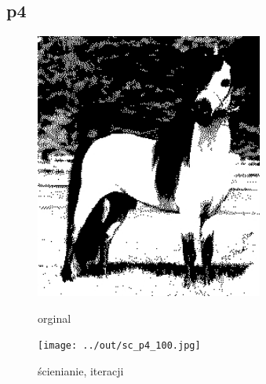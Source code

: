 \documentclass[a4paper,12pt]{article}
\begin{document}
\newpage
\subsection{p4}

\begin{figure}[h!]
\begin{minipage}[t]{7.5cm}
\begin{center}
\includegraphics[width=7.5cm]{../in/p4.jpg}
\caption{orginal}
\end{center}
\end{minipage}
\hfill
\begin{minipage}[t]{7.5cm}
\begin{center}
\texttt{[image: ../out/sc\_p4\_100.jpg]}
\caption{ścienianie, \protect iteracji}
\end{center}
\end{minipage}
\end{figure}
\end{document}
